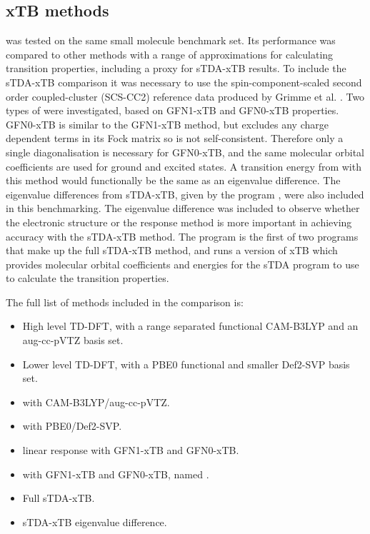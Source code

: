 \subsection{xTB methods}
\label{subsec:dscf_gfn_tests}
\dxtb was tested on the same small molecule benchmark set. Its performance was compared
to other methods with a range of approximations for calculating transition properties, 
including a proxy for sTDA-xTB results. To include the sTDA-xTB comparison it was
necessary to use the spin-component-scaled second order coupled-cluster (SCS-CC2)
\cite{Hattig2000, Hellweg2008} reference data produced by Grimme et al. \cite{Grimme}.
Two types of \dxtb were investigated, based on GFN1-xTB and GFN0-xTB properties.
GFN0-xTB is similar to the GFN1-xTB method, but excludes any charge dependent terms
in its Fock matrix so is not self-consistent. Therefore only a single diagonalisation
is necessary for GFN0-xTB, and the same molecular orbital coefficients are used for
ground and excited states. A transition energy from \dscf with this method would
functionally be the same as an eigenvalue difference.
The eigenvalue differences from sTDA-xTB, given by the  program
\cite{Grimme2016}, were also included in this benchmarking. The  
eigenvalue difference was included to observe whether the electronic structure or
the response method is more important in achieving accuracy with the sTDA-xTB method.
The  program is the first of two programs that make up the full sTDA-xTB
method, and runs a version of xTB which provides molecular orbital coefficients 
and energies for the sTDA program to use to calculate the transition properties.

The full list of methods included in the comparison is:
\begin{itemize}
    \item High level TD-DFT, with a range separated functional CAM-B3LYP and
     an aug-cc-pVTZ basis set.
    \item Lower level TD-DFT, with a PBE0 functional and smaller Def2-SVP basis set.
    \item \dscf with CAM-B3LYP/aug-cc-pVTZ.
    \item \dscf with PBE0/Def2-SVP.
    \item linear response with GFN1-xTB and GFN0-xTB.
    \item \dscf with GFN1-xTB and GFN0-xTB, named \dxtb.
    \item Full sTDA-xTB.
    \item sTDA-xTB eigenvalue difference.
\end{itemize}
 

